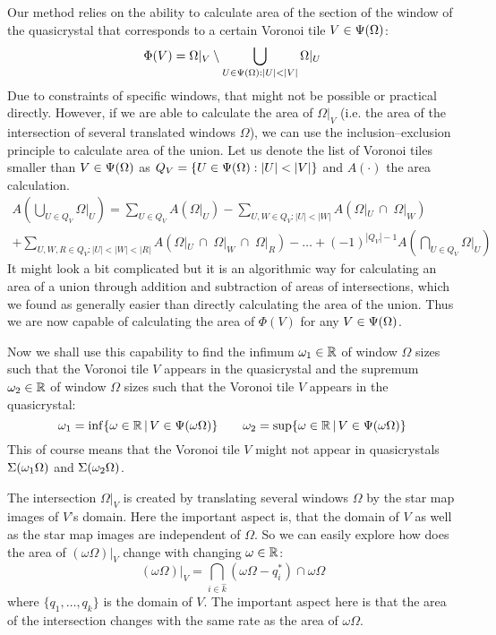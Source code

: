 \documentclass[text.tex]{subfiles}
\begin{document}
Our method relies on the ability to calculate area of the section of the window of the quasicrystal that corresponds to a certain Voronoi tile $V\in\Psi(\Omega)$: 
$$\Phi(V) = \Omega|_{V}\setminus\bigcup_{U\in\quasilist{\Omega}:|U|<|V|}\Omega|_{U}$$
Due to constraints of specific windows, that might not be possible or practical directly. However, if we are able to calculate the area of $\Omega|_{V}$ (i.e. the area of the intersection of several translated windows $\Omega$), we can use the inclusion--exclusion principle to calculate area of the union. Let us denote the list of Voronoi tiles smaller than $V\in\Psi(\Omega)$ as $Q_V = \{U\in\quasilist{\Omega}:|U|<|V|\}$ and $A(\cdot)$ the area calculation. 
\begin{multline*}
A\left(\bigcup_{U\in Q_V}\Omega|_{U}\right) = \sum_{U\in Q_V}A(\Omega|_U) - \sum_{U,W\in Q_V:|U|<|W|}A(\Omega|_U\,\cap\;\Omega|_W)\\
+\sum_{U,W,R\in Q_V:|U|<|W|<|R|}A(\Omega|_U\,\cap\;\Omega|_W\,\cap\;\Omega|_R) - \dots + (-1)^{|Q_V|-1}A\left(\bigcap_{U\in Q_V} \Omega|_U\right)
\end{multline*}
It might look a bit complicated but it is an algorithmic way for calculating an area of a union through addition and subtraction of areas of intersections, which we found as generally easier than directly calculating the area of the union. Thus we are now capable of calculating the area of $\Phi(V)$ for any $V\in\Psi(\Omega)$. 

Now we shall use this capability to find the infimum $\omega_1\in\mathbb{R}$ of window $\Omega$ sizes such that the Voronoi tile $V$ appears in the quasicrystal and the supremum $\omega_2\in\mathbb{R}$ of window $\Omega$ sizes such that the Voronoi tile $V$ appears in the quasicrystal:
$$\omega_1 = \inf\{\omega\in\mathbb{R} \,|\, V\in\Psi(\omega\Omega)\} \qquad \omega_2 = \sup\{\omega\in\mathbb{R} \,|\, V\in\Psi(\omega\Omega)\}$$
This of course means that the Voronoi tile $V$ might not appear in quasicrystals $\Sigma(\omega_1\Omega)$ and $\Sigma(\omega_2\Omega)$. 

The intersection $\Omega|_V$ is created by translating several windows $\Omega$ by the star map images of $V$'s domain. Here the important aspect is, that the domain of $V$ as well as the star map images are independent of $\Omega$. So we can easily explore how does the area of $(\omega\Omega)|_V$ change with changing $\omega\in\mathbb{R}$:
$$(\omega\Omega)|_V = \bigcap\limits_{i\in\hat{k}}(\omega\Omega-q_i^\ast)\cap\omega\Omega$$
where $\{q_1,\dots,q_k\}$ is the domain of $V$. The important aspect here is that the area of the intersection changes with the same rate as the area of $\omega\Omega$. 
\end{document}
